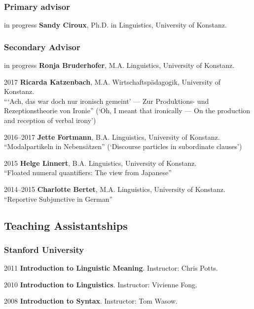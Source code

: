 \subsubsection*{Primary advisor}
\begin{dated}
	\item[in progress]
		\textbf{Sandy Ciroux},
		Ph.D. in Linguistics,
		University of Konstanz.
\end{dated}
\subsubsection*{Secondary Advisor}
\begin{dated}
	\item[in progress] 
		\textbf{Ronja Bruderhofer}, 
		M.A. Linguistics, 
		University of Konstanz.
	\item[2017] 
		\textbf{Ricarda Katzenbach}, 
		M.A. Wirtschaftspädagogik, 
		University of Konstanz.\\
		{``{}`Ach, das war doch nur ironisch gemeint' --- Zur Produktions- und Rezeptionstheorie von Ironie''} (`Oh, I meant that ironically --- On the production and reception of verbal irony')
	\item[2016--2017]
		\textbf{Jette Fortmann}, 
		B.A. Linguistics,
		University of Konstanz.\\
        {``Modalpartikeln in Nebens\"atzen'' (`Discourse particles in subordinate clauses')}
    \item[2015]
    	\textbf{Helge Linnert}, 
    	B.A. Linguistics,
    	University of Konstanz.\\
        {``Floated numeral quantifiers: The view from Japanese''}
    \item[2014--2015]
    	\textbf{Charlotte Bertet}, 
    	M.A. Linguistics,
    	University of Konstanz.\\
        {``Reportive Subjunctive in German''}
\end{dated}
%
\subsection*{Teaching Assistantships}
%
\subsubsection*{Stanford University}
%
\begin{dated}
	\item[2011] \textbf{Introduction to Linguistic Meaning}. Instructor: Chris Potts.
	\item[2010] \textbf{Introduction to Linguistics}. Instructor: Vivienne Fong.
	\item[2008] \textbf{Introduction to Syntax}. Instructor: Tom Wasow.
\end{dated}
%
